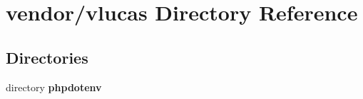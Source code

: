 \section{vendor/vlucas Directory Reference}
\label{dir_3d0d6ebfffa17575c3248c11fc49b852}
\subsection*{Directories}
\begin{DoxyCompactItemize}
\item 
directory {\bf phpdotenv}
\end{DoxyCompactItemize}
